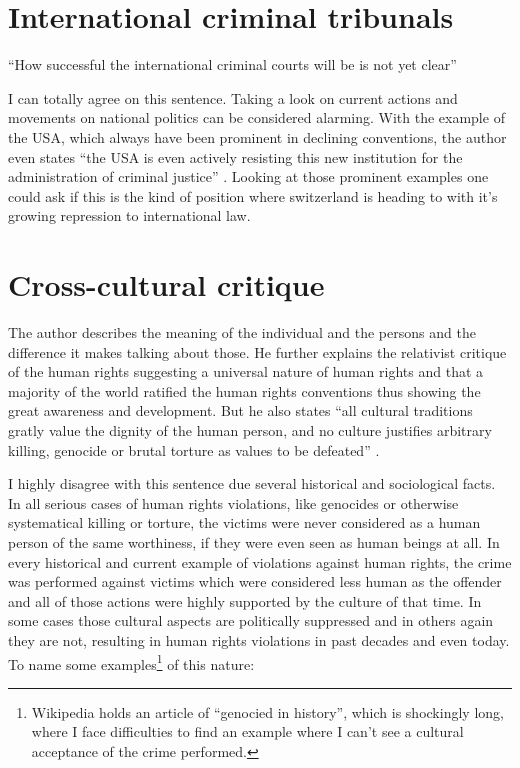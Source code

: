 \section{International criminal tribunals}
``How successful the international criminal courts will be is not yet
clear''
\cite[p. 33]{tfohr}

I can totally agree on this sentence. Taking a look on current actions and
movements on national politics can be considered alarming. With the example
of the USA, which always have been prominent in declining conventions, the
author even states ``the USA is even actively resisting this new institution
for the administration of criminal justice'' \cite[p. 33]{tfohr}. Looking at
those prominent examples one could ask if this is the kind of position
where switzerland is heading to with it's growing repression to international
law.

\section{Cross-cultural critique}
The author describes the meaning of the individual and the persons and the
difference it makes talking about those. He further explains the relativist
critique of the human rights suggesting a universal nature of human rights
and that a majority of the world ratified the human rights conventions thus
showing the great awareness and development. But he also states ``all
cultural traditions gratly value the dignity of the human person, and no
culture justifies arbitrary killing, genocide or brutal torture as values to
be defeated'' \cite[p. 36]{tfohr}.

I highly disagree with this sentence due several historical and sociological
facts. In all serious cases of human rights violations, like genocides or
otherwise systematical killing or torture, the victims were never considered
as a human person of the same worthiness, if they were even seen as human
beings at all. In every historical and current example of violations against
human rights, the crime was performed against victims which were considered
less human as the offender and all of those actions were highly supported by
the culture of that time. In some cases those cultural aspects are politically
suppressed and in others again they are not, resulting in human rights
violations in past decades and even today. To name some
examples\footnote{Wikipedia holds an article of ``genocied in history'',
which is shockingly long, where I face difficulties to find an example where
I can't see a cultural acceptance of the crime performed.} of this nature:

